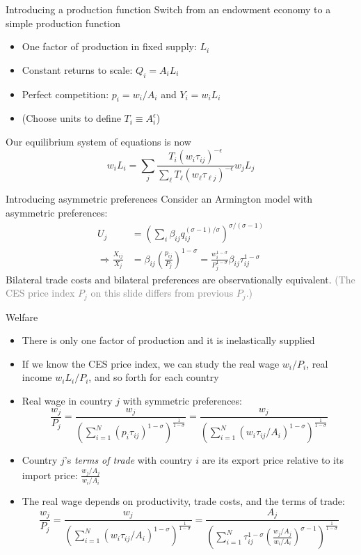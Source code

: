 \documentclass[10pt,notes=hide,aspectratio=169]{beamer}
\begin{document}
\begin{frame}{Introducing a production function}
Switch from an endowment economy to a simple production function
\begin{itemize}
\item 
One factor of production in fixed supply: $L_i$
\item
Constant returns to scale: $Q_i = A_i L_i$
\item
Perfect competition: $p_{i} = w_i / A_i$ and $Y_i = w_i L_i$
\item
(Choose units to define $T_i \equiv A_i^{\epsilon}$)
\end{itemize}
Our equilibrium system of equations is now
$$
w_i L_i
=
\sum_j \frac{T_i \left(w_i \tau_{ij}\right)^{-\epsilon}}{\sum_{\ell} T_{\ell} \left(w_{\ell} \tau_{\ell j}\right)^{-\epsilon}} w_j L_j
$$
\end{frame}
\begin{frame}{Introducing asymmetric preferences}
Consider an Armington model with asymmetric preferences:
\begin{align*}
	U_j &= \left(\sum_{i} \beta_{ij} q_{ij}^{(\sigma-1)/\sigma}\right)^{\sigma/(\sigma-1)}
	\\
	\Rightarrow
	\frac{X_{ij}}{X_j} &= \beta_{ij} \left(\frac{p_{ij}}{P_j}\right)^{1-\sigma} 
	=
	\frac{w_i^{1-\sigma}}{P_j^{1-\sigma}}\beta_{ij}\tau_{ij}^{1-\sigma}
\end{align*}
Bilateral trade costs and bilateral preferences are observationally equivalent.
\textcolor{gray}{(The CES price index $P_j$ on this slide differs from previous $P_j$.)}
\end{frame}
\begin{frame}{Welfare}
\begin{itemize}
\item There is only one factor of production and it is inelastically supplied
\item If we know the CES price index, we can study the real wage $w_i / P_i$, real income $w_i L_i / P_i$, and so forth for each country
\item Real wage in country $j$ with symmetric preferences:
$$
\frac{w_j}{P_{j}}
=
\frac{w_j}{\left(\sum_{i=1}^{N} \left(p_{i}\tau_{ij}\right)^{1-\sigma}\right)^{\frac{1}{1-\sigma}}}
=
\frac{w_j}{\left(\sum_{i=1}^{N} \left(w_i \tau_{ij} / A_i\right)^{1-\sigma}\right)^{\frac{1}{1-\sigma}}}
$$
\item Country $j$'s \textit{terms of trade} with country $i$ are its export price relative to its import price:
$\frac{w_j/A_j}{w_i/A_i}$
\item The real wage depends on productivity, trade costs, and the terms of trade:
$$
\frac{w_j}{P_{j}}
=
\frac{w_j}{\left(\sum_{i=1}^{N} \left(w_i \tau_{ij} / A_i\right)^{1-\sigma}\right)^{\frac{1}{1-\sigma}}}
=
\frac{A_j}{\left(\sum_{i=1}^{N}  \tau_{ij}^{1-\sigma} \left(\frac{w_j/A_j}{w_i/A_i}\right)^{\sigma-1}\right)^{\frac{1}{1-\sigma}}}
$$
\end{itemize}
\end{frame}
\end{document}
